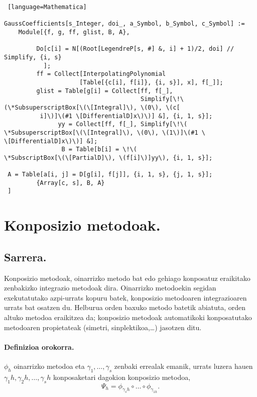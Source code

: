 \begin{lstlisting} [language=Mathematica]

GaussCoefficients[s_Integer, doi_, a_Symbol, b_Symbol, c_Symbol] :=
    Module[{f, g, ff, glist, B, A},
 
         Do[c[i] = N[(Root[LegendreP[s, #] &, i] + 1)/2, doi] // Simplify, {i, s}
           ];
         ff = Collect[InterpolatingPolynomial
                     [Table[{c[i], f[i]}, {i, s}], x], f[_]];
         glist = Table[g[i] = Collect[ff, f[_],
                                      Simplify[\!\(\*SubsuperscriptBox[\(\[Integral]\), \(0\), \(c[
          i]\)]\(#1 \[DifferentialD]x\)\)] &], {i, 1, s}];
               yy = Collect[ff, f[_], Simplify[\!\(
\*SubsuperscriptBox[\(\[Integral]\), \(0\), \(1\)]\(#1 \
\[DifferentialD]x\)\)] &];
                B = Table[b[i] = \!\(
\*SubscriptBox[\(\[PartialD]\), \(f[i]\)]yy\), {i, 1, s}];
               
 A = Table[a[i, j] = D[g[i], f[j]], {i, 1, s}, {j, 1, s}];
         {Array[c, s], B, A}
 ]

\end{lstlisting}


\section{Konposizio metodoak.}

\subsection{Sarrera.}

Konposizio metodoak, oinarrizko metodo bat edo gehiago konposatuz eraikitako zenbakizko integrazio metodoak dira.  Oinarrizko metodoekin segidan exekutatutako azpi-urrats kopuru batek, konposizio metodoaren integrazioaren urrats bat osatzen du. Helburua orden baxuko metodo batetik abiatuta, orden altuko metodoa eraikitzea da; konposizio metodoak automatikoki konposatutako metodoaren propietateak (simetri, sinplektikoa,\dots) jasotzen ditu. 

\paragraph*{\textbf{Definizioa orokorra}.}
$\phi_h$ oinarrizko metodoa eta $\gamma_1,\dots,\gamma_s$ zenbaki errealak emanik, urrats luzera hauen $\gamma_1 h,\gamma_2 h,\dots,\gamma_s h$ konposaketari dagokion konposizio metodoa,
\begin{equation}
\Psi_h=\phi_{\gamma_s h} \circ \dots \circ \phi_{\gamma_{1 h}}.
\end{equation}


